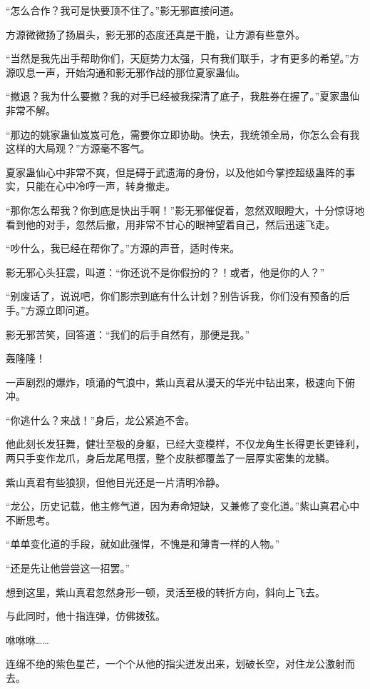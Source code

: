 \begin{this_body}
“怎么合作？我可是快要顶不住了。”影无邪直接问道。

方源微微扬了扬眉头，影无邪的态度还真是干脆，让方源有些意外。

“当然是我先出手帮助你们，天庭势力太强，只有我们联手，才有更多的希望。”方源叹息一声，开始沟通和影无邪作战的那位夏家蛊仙。

“撤退？我为什么要撤？我的对手已经被我探清了底子，我胜券在握了。”夏家蛊仙非常不解。

“那边的姚家蛊仙岌岌可危，需要你立即协助。快去，我统领全局，你怎么会有我这样的大局观？”方源毫不客气。

夏家蛊仙心中非常不爽，但是碍于武遗海的身份，以及他如今掌控超级蛊阵的事实，只能在心中冷哼一声，转身撤走。

“那你怎么帮我？你到底是快出手啊！”影无邪催促着，忽然双眼瞪大，十分惊讶地看到他的对手，忽然后撤，用非常不甘心的眼神望着自己，然后迅速飞走。

“吵什么，我已经在帮你了。”方源的声音，适时传来。

影无邪心头狂震，叫道：“你还说不是你假扮的？！或者，他是你的人？”

“别废话了，说说吧，你们影宗到底有什么计划？别告诉我，你们没有预备的后手。”方源立即问道。

影无邪苦笑，回答道：“我们的后手自然有，那便是我。”

轰隆隆！

一声剧烈的爆炸，喷涌的气浪中，紫山真君从漫天的华光中钻出来，极速向下俯冲。

“你逃什么？来战！”身后，龙公紧追不舍。

他此刻长发狂舞，健壮至极的身躯，已经大变模样，不仅龙角生长得更长更锋利，两只手变作龙爪，身后龙尾甩摆，整个皮肤都覆盖了一层厚实密集的龙鳞。

紫山真君有些狼狈，但他目光还是一片清明冷静。

“龙公，历史记载，他主修气道，因为寿命短缺，又兼修了变化道。”紫山真君心中不断思考。

“单单变化道的手段，就如此强悍，不愧是和薄青一样的人物。”

“还是先让他尝尝这一招罢。”

想到这里，紫山真君忽然身形一顿，灵活至极的转折方向，斜向上飞去。

与此同时，他十指连弹，仿佛拨弦。

咻咻咻……

连绵不绝的紫色星芒，一个个从他的指尖迸发出来，划破长空，对住龙公激射而去。


\end{this_body}
